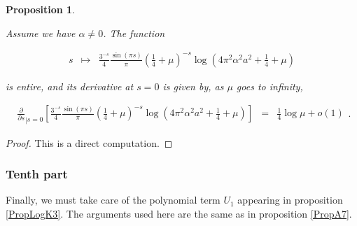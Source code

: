 \documentclass{jams-l}
\newtheorem{proposition}[theorem]{Proposition}
\theoremstyle{definition}
\theoremstyle{remark}
\numberwithin{equation}{section}
\begin{document}
            \begin{proposition}
            \label{PropA9-0}
            
                Assume we have $\alpha \neq 0$. The function
                
                \[ \begin{array}{lll}
                        s & \longmapsto & \frac{3^{-s}}{4} \frac{\sin \left( \pi s \right)}{\pi} \left( \frac{1}{4} + \mu \right)^{-s} \log \left( 4 \pi^2 \alpha^2 a^2 + \frac{1}{4} + \mu \right)
                    \end{array} \]
                
                \noindent is entire, and its derivative at $s = 0$ is given by, as $\mu$ goes to infinity,
                
                \[ \begin{array}{lll}
                        \scriptstyle \frac{\partial}{\partial s}_{\left \vert s = 0 \right.} \left[ \frac{3^{-s}}{4} \frac{\sin \left( \pi s \right)}{\pi} \left( \frac{1}{4} + \mu \right)^{-s} \log \left( 4 \pi^2 \alpha^2 a^2 + \frac{1}{4} + \mu \right) \right] & \scriptstyle = & \scriptstyle \frac{1}{4} \log \mu + o \left( 1 \right)
                    \end{array} . \]
            
            \end{proposition}
            
            \begin{proof}
            
                This is a direct computation.
            
            \end{proof}
        
        
        \subsubsection*{\textbf{Tenth part}}
        \label{ATenthPart}
        
            Finally, we must take care of the polynomial term $U_1$ appearing in proposition \ref{PropLogK3}. The arguments used here are the same as in proposition \ref{PropA7}.
            
\end{document}
